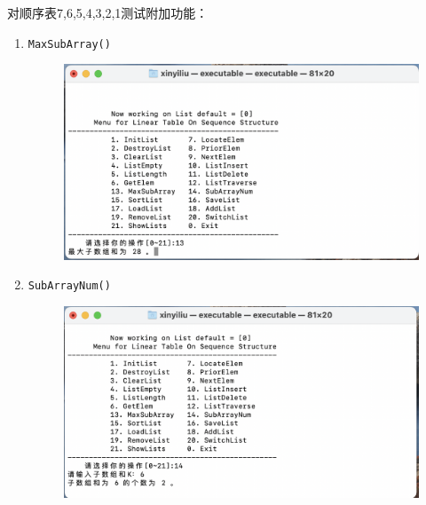 \documentclass[supercite]{Experimental_Report}
\theoremstyle{definition}
\begin{document}
对顺序表{7,6,5,4,3,2,1}测试附加功能：
\begin{enumerate}

	\item \verb|MaxSubArray()|
	\begin{figure}[!htb]
		\includegraphics[width=0.8\linewidth]{images/截屏2023-06-01 22.14.26.png}
	\end{figure}
	\FloatBarrier

		
	\item \verb|SubArrayNum()|
	\begin{figure}[!htb]
		\includegraphics[width=0.8\linewidth]{images/截屏2023-06-01 22.14.44.png}
	\end{figure}
	\FloatBarrier

	\newpage


\end{enumerate}
\end{document}
